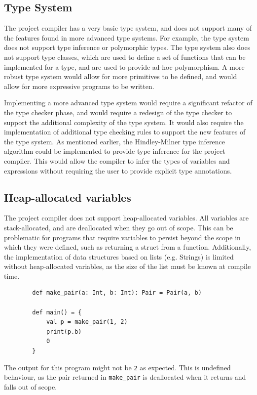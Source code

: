 \subsection{Type System}

The project compiler has a very basic type system, and does not support many of the features found
in more advanced type systems. For example, the type system does not support type inference or
polymorphic types. The type system also does not support type classes, which are used to define a
set of functions that can be implemented for a type, and are used to provide ad-hoc polymorphism.
A more robust type system would allow for more primitives to be defined, and would allow for more
expressive programs to be written.

Implementing a more advanced type system would require a significant refactor of the type checker
phase, and would require a redesign of the type checker to support the additional complexity of the
type system. It would also require the implementation of additional type checking rules to support
the new features of the type system. As mentioned earlier, the Hindley-Milner type inference
algorithm could be implemented to provide type inference for the project compiler. This would allow
the compiler to infer the types of variables and expressions without requiring the user to provide
explicit type annotations.

\subsection{Heap-allocated variables}

The project compiler does not support heap-allocated variables. All variables are stack-allocated,
and are deallocated when they go out of scope. This can be problematic for programs that require
variables to persist beyond the scope in which they were defined, such as returning a struct from a
function. Additionally, the implementation of data structures based on lists (e.g. Strings) is
limited without heap-allocated variables, as the size of the list must be known at compile time.

\begin{tcolorbox}
    \begin{verbatim}
        def make_pair(a: Int, b: Int): Pair = Pair(a, b)

        def main() = {
            val p = make_pair(1, 2)
            print(p.b)
            0
        }
    \end{verbatim}
    \tcblower
    \footnotesize
    The output for this program might not be \texttt{2} as expected. This is undefined behaviour, as
    the pair returned in \texttt{make\_pair} is deallocated when it returns and falls out of scope.
\end{tcolorbox}

